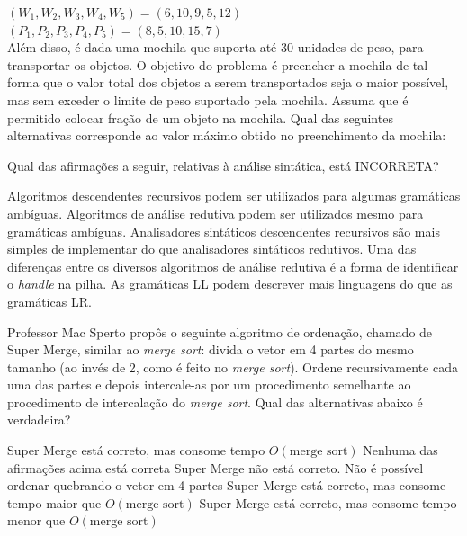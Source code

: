 \documentclass[12pt, addpoints]{exam}
\begin{document}
\begin{questions}
 $(W_1, W_2, W_3, W_4, W_5) = (6, 10, 9, 5, 12)$\\

 $(P_1, P_2, P_3, P_4, P_5) = (8, 5, 10, 15, 7)$\\

Além disso, é dada uma mochila que suporta até 30 unidades de peso, para transportar os objetos. O objetivo do problema é preencher a mochila de tal forma que o valor total dos objetos a serem transportados seja o maior possível, mas sem exceder o limite de peso suportado pela mochila. Assuma que é permitido colocar fração de um objeto na mochila. Qual das seguintes alternativas corresponde ao valor máximo obtido no preenchimento da mochila:
\begin{choices}
\end{choices}

\question

Qual das afirmações a seguir, relativas à análise sintática, está INCORRETA?


\begin{choices}
\choice Algoritmos descendentes recursivos podem ser utilizados para algumas gramáticas ambíguas.
\choice Algoritmos de análise redutiva podem ser utilizados mesmo para gramáticas ambíguas.
\choice Analisadores sintáticos descendentes recursivos são mais simples de implementar do que analisadores sintáticos redutivos.
\choice Uma das diferenças entre os diversos algoritmos de análise redutiva é a forma de identificar o \textit{handle} na pilha.
\choice As gramáticas LL podem descrever mais linguagens do que as gramáticas LR.
\end{choices}

\question

Professor Mac Sperto propôs o seguinte algoritmo de ordenação, chamado de Super Merge, similar ao \textit{merge sort}: divida o vetor em 4 partes do mesmo tamanho (ao invés de 2, como é feito no \textit{merge sort}). Ordene recursivamente cada uma das partes e depois intercale-as por um procedimento semelhante ao procedimento de intercalação do \textit{merge sort}. Qual das alternativas abaixo é verdadeira?
\begin{choices}
\choice Super Merge está correto, mas consome tempo \( O(\text{merge sort}) \)
\choice Nenhuma das afirmações acima está correta
\choice Super Merge não está correto. Não é possível ordenar quebrando o vetor em 4 partes
\choice Super Merge está correto, mas consome tempo maior que \( O(\text{merge sort}) \)
\choice Super Merge está correto, mas consome tempo menor que \( O(\text{merge sort}) \)
\end{choices}


\end{questions}
\end{document}
